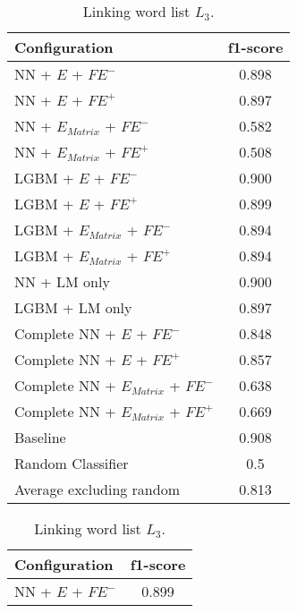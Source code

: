 \begin{table}[h]
  	\tiny
  	\centering
	\begin{subtable}{.5\textwidth}
		\centering
  		\renewcommand{\arraystretch}{1.4}
   		\begin{tabular}{|| l || c ||}
   			\hline
   			{Configuration} & {f1-score} \\
   			\hline\hline
   			NN + $E$ + $\textit{FE}^-$ &  0.898 \\
 			\hline
 			NN + $E$ + $\textit{FE}^+$ & 0.897 \\
 			\hline
 			NN + $E_{Matrix}$ + $\textit{FE}^-$ & 0.582 \\
 			\hline
 			NN + $E_{Matrix}$ + $\textit{FE}^+$ & 0.508 \\
 			\hline
 			LGBM + $E$ + $\textit{FE}^-$ & 0.900 \\
 			\hline
 			LGBM + $E$ + $\textit{FE}^+$ & 0.899 \\
 			\hline
 			LGBM + $E_{Matrix}$ + $\textit{FE}^-$ & 0.894 \\
 			\hline
 			LGBM + $E_{Matrix}$ + $\textit{FE}^+$ & 0.894 \\
 			\hline
 			NN + LM only & 0.900 \\
 			\hline
 			LGBM + LM only & 0.897 \\
 			\hline
 			Complete NN + $E$ + $\textit{FE}^-$ & 0.848 \\
 			\hline
 			Complete NN + $E$ + $\textit{FE}^+$ & 0.857 \\
 			\hline
 			Complete NN + $E_{Matrix}$ + $\textit{FE}^-$ & 0.638 \\
 			\hline
 			Complete NN + $E_{Matrix}$ + $\textit{FE}^+$ & 0.669 \\
 			\hline
 			Baseline & 0.908 \\
 			\hline
 			Random Classifier & 0.5 \\
 			\hline
 			\hline
 			Average excluding random & 0.813 \\
 			\hline
		\end{tabular}
		\renewcommand{\arraystretch}{1}
  		\caption{Linking word list $L_3$.}%
  	\end{subtable}%
  	\begin{subtable}{.5\textwidth}
		\centering
  		\renewcommand{\arraystretch}{1.4}
   		\begin{tabular}{|| l || c ||}
   			\hline
   			{Configuration} & {f1-score} \\
   			\hline\hline
   			NN + $E$ + $\textit{FE}^-$ &  0.899 \\

\end{tabular}
\end{subtable}
\end{table}
